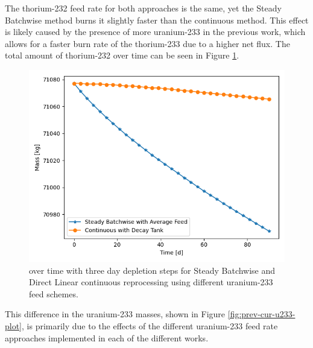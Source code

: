 The thorium-232 feed rate for both approaches is the same, yet the Steady Batchwise method burns it slightly faster than the continuous method. This effect is likely caused by the presence of more uranium-233 in the previous work, which allows for a faster burn rate of the thorium-233 due to a higher net flux. The total amount of thorium-232 over time can be seen in Figure \ref{fig:prev-cur-th232-plot}.

\begin{figure}[H]
  \centering
  \includegraphics[scale=0.7]{images/prev-cur-th232.png}
  \caption{ over time with three day depletion steps for Steady Batchwise and Direct Linear continuous reprocessing using different uranium-233 feed schemes.}
   \label{fig:prev-cur-th232-plot}
\end{figure}

This difference in the uranium-233 masses, shown in Figure \ref{fig:prev-cur-u233-plot}, is primarily due to the effects of the different uranium-233 feed rate approaches implemented in each of the different works.

